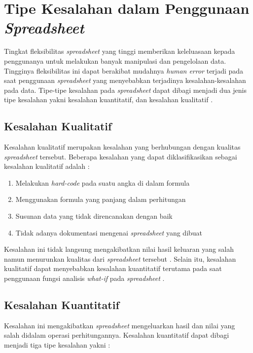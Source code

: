 \section{Tipe Kesalahan dalam Penggunaan \textit{Spreadsheet}}
Tingkat fleksibilitas \textit{spreadsheet} yang tinggi memberikan keleluasaan kepada penggunanya untuk melakukan banyak manipulasi dan pengelolaan data. Tingginya fleksibilitas ini dapat berakibat mudahnya \textit{human error} terjadi pada saat penggunaan \textit{spreadsheet} yang menyebabkan terjadinya kesalahan-kesalahan pada data. Tipe-tipe kesalahan pada \textit{spreadsheet} dapat dibagi menjadi dua jenis tipe kesalahan yakni kesalahan kuantitatif, dan kesalahan kualitatif \parencite{Panko1998}. 

    \subsection{Kesalahan Kualitatif}
    Kesalahan kualitatif merupakan kesalahan yang berhubungan dengan kualitas \textit{spreadsheet} tersebut. Beberapa kesalahan yang dapat diklasifikasikan sebagai kesalahan kualitatif adalah \parencite{Powell2009}:

    \begin{enumerate}
        \item Melakukan \textit{hard-code} pada suatu angka di dalam formula
        \item Menggunakan formula yang panjang dalam perhitungan
        \item Susunan data yang tidak direncanakan dengan baik
        \item Tidak adanya dokumentasi mengenai \textit{spreadsheet} yang dibuat
    \end{enumerate}

    Kesalahan ini tidak langsung mengakibatkan nilai hasil keluaran yang salah namun menurunkan kualitas dari \textit{spreadsheet} tersebut \parencite{Rajalingham2001}. Selain itu, kesalahan kualitatif dapat menyebabkan kesalahan kuantitatif terutama pada saat penggunaan fungsi analisis \textit{what-if} pada \textit{spreadsheet} \parencite{Panko1998}.

    \subsection{Kesalahan Kuantitatif}
    Kesalahan ini mengakibatkan \textit{spreadsheet} mengeluarkan hasil dan nilai yang salah didalam operasi perhitungannya. Kesalahan kuantitatif dapat dibagi menjadi tiga tipe kesalahan yakni \parencite{Panko1998}:

